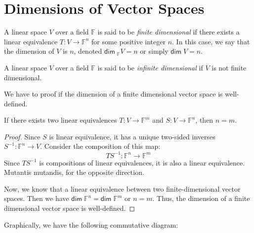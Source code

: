 \documentclass[
	11pt, %
	fleqn, %
	a4paper, %
]{LegrandOrangeBook}
\newcommand{\F}{\mathbb{F}} %
\renewcommand{\dim}{\mathsf{dim\;}} %
\begin{document}
\newpage

\section{Dimensions of Vector Spaces}

\begin{definition} \label{def:finite_dimensional_vector_space}
    A linear space $V$ over a field $\F$ is said to be \emph{finite dimensional} if there exists a linear equivalence $T: V \to \F^n$ for some positive integer $n$. In this case, we say that the dimension of $V$ is $n$, denoted $\dim_{\F} V = n$ or simply $\dim V = n$.
\end{definition}

\begin{definition}
    A linear space $V$ over a field $\F$ is said to be \emph{infinite dimensional} if $V$ is not finite dimensional.
\end{definition}

We have to proof if the dimension of a finite dimensional vector space is well-defined.

\begin{proposition}
    If there exists two linear equivalences $T: V \to \F^m$ and $S: V \to \F^n$, then $n = m$.
\end{proposition}

\begin{proof}
    Since $S$ is linear equivalence, it has a unique two-sided inverses $S^{-1}: \F^n \to V$. Consider the composition of this map:
    \[
        TS^{-1}: \F^n \to \F^m
    \]
    Since $TS^{-1}$ is compositions of linear equivalences, it is also a linear equivalence. Mutantis mutandis, for the opposite direction.

    Now, we know that a linear equivalence between two finite-dimensional vector spaces. Then we have $\dim \F^n = \dim \F^m$ or $n = m$. Thus, the dimension of a finite dimensional vector space is well-defined.
\end{proof}

Graphically, we have the following commutative diagram:
\begin{center}
\end{center}
\end{document}

